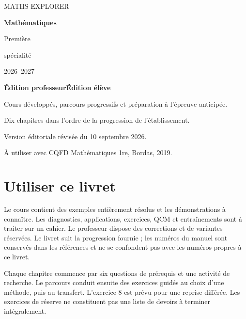 \begin{titlepage}
\color{bleu}\sffamily
{\large MATHS EXPLORER\par}
\vspace{22mm}
{\fontsize{35}{40}\selectfont\bfseries Mathématiques\par}
\vspace{6mm}
{\LARGE Première\par spécialité\par}
\vspace{12mm}
{\Large 2026--2027\par}
\vspace{10mm}
\vfill
{\Large\bfseries\ifprof Édition professeur\else Édition élève\fi\par}
\vspace{4mm}
Cours développés, parcours progressifs et préparation à l’épreuve anticipée.\par
Dix chapitres dans l’ordre de la progression de l’établissement.\par
\vspace{8mm}
{\small Version éditoriale révisée du 10 septembre 2026.\par À utiliser avec CQFD Mathématiques 1re, Bordas, 2019.}
\end{titlepage}
\chapter*{Utiliser ce livret}
Le cours contient des exemples entièrement résolus et les démonstrations à connaître. Les diagnostics, applications, exercices, QCM et entraînements sont à traiter sur un cahier. Le professeur dispose des corrections et de variantes réservées. Le livret suit la progression fournie ; les numéros du manuel sont conservés dans les références et ne se confondent pas avec les numéros propres à ce livret.

Chaque chapitre commence par six questions de prérequis et une activité de recherche. Le parcours conduit ensuite des exercices guidés au choix d’une méthode, puis au transfert. L’exercice 8 est prévu pour une reprise différée. Les exercices de réserve ne constituent pas une liste de devoirs à terminer intégralement.

